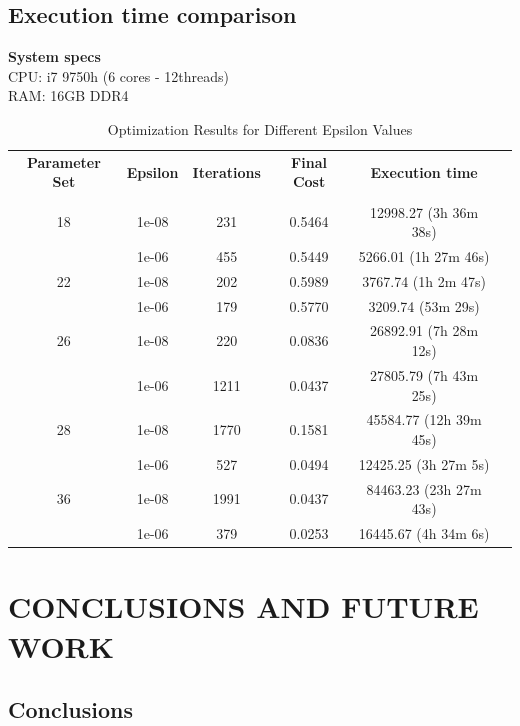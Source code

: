\documentclass[inscr,ack,preface]{diphdthesis}
\begin{document}
\section{Execution time comparison}

\textbf{System specs} \\
CPU: i7 9750h (6 cores - 12threads)\\
RAM: 16GB DDR4\\

\begin{table}[htbp]
  \centering
  \caption{Optimization Results for Different Epsilon Values}
  \label{tab:results}
  \begin{tabular}{cccccc}
    \toprule
    \textbf{Parameter Set} & \textbf{Epsilon} & \textbf{Iterations} & \textbf{Final Cost} & \textbf{Execution time} \\
    & & & \\
    \midrule
    18 & 1e-08   & 231 & 0.5464 & 12998.27 (3h 36m 38s) \\
       & 1e-06   & 455 & 0.5449 & 5266.01 (1h 27m 46s) \\
    \midrule
    22 & 1e-08   & 202 & 0.5989 & 3767.74 (1h 2m 47s) \\
       & 1e-06   & 179 & 0.5770 & 3209.74 (53m 29s) \\
    \midrule
    26 & 1e-08   & 220  & 0.0836 & 26892.91 (7h 28m 12s) \\
       & 1e-06   & 1211 & 0.0437 & 27805.79 (7h 43m 25s) \\
    \midrule
    28 & 1e-08   & 1770 & 0.1581 & 45584.77 (12h 39m 45s) \\
       & 1e-06   & 527  & 0.0494 & 12425.25 (3h 27m 5s) \\
    \midrule
    36 & 1e-08   & 1991 & 0.0437 & 84463.23 (23h 27m 43s) \\
       & 1e-06   & 379  & 0.0253 & 16445.67 (4h 34m 6s) \\
    \bottomrule
  \end{tabular}
\end{table}


\chapter{CONCLUSIONS AND FUTURE WORK}

\section{Conclusions}
\end{document}
